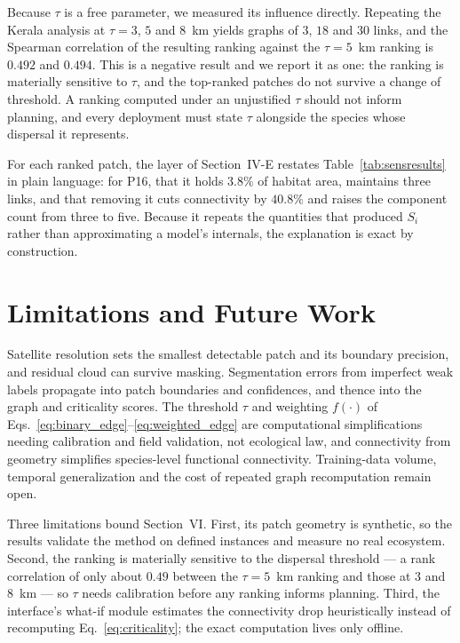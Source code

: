 \documentclass[conference]{IEEEtran}
\begin{document}
Because $\tau$ is a free parameter, we measured its influence directly. Repeating the Kerala analysis at $\tau = 3$, $5$ and $8$~km yields graphs of $3$, $18$ and $30$ links, and the Spearman correlation of the resulting ranking against the $\tau = 5$~km ranking is $0.492$ and $0.494$. This is a negative result and we report it as one: the ranking is materially sensitive to $\tau$, and the top-ranked patches do not survive a change of threshold. A ranking computed under an unjustified $\tau$ should not inform planning, and every deployment must state $\tau$ alongside the species whose dispersal it represents.

For each ranked patch, the layer of Section~IV-E restates Table~\ref{tab:sensresults} in plain language: for P16, that it holds $3.8\%$ of habitat area, maintains three links, and that removing it cuts connectivity by $40.8\%$ and raises the component count from three to five. Because it repeats the quantities that produced $S_i$ rather than approximating a model's internals, the explanation is exact by construction.


\section{Limitations and Future Work}

Satellite resolution sets the smallest detectable patch and its boundary precision, and residual cloud can survive masking. Segmentation errors from imperfect weak labels propagate into patch boundaries and confidences, and thence into the graph and criticality scores. The threshold $\tau$ and weighting $f(\cdot)$ of Eqs.~\eqref{eq:binary_edge}--\eqref{eq:weighted_edge} are computational simplifications needing calibration and field validation, not ecological law, and connectivity from geometry simplifies species-level functional connectivity. Training-data volume, temporal generalization and the cost of repeated graph recomputation remain open.

Three limitations bound Section~VI. First, its patch geometry is synthetic, so the results validate the method on defined instances and measure no real ecosystem. Second, the ranking is materially sensitive to the dispersal threshold --- a rank correlation of only about $0.49$ between the $\tau = 5$~km ranking and those at $3$ and $8$~km --- so $\tau$ needs calibration before any ranking informs planning. Third, the interface's what-if module estimates the connectivity drop heuristically instead of recomputing Eq.~\eqref{eq:criticality}; the exact computation lives only offline.
\end{document}
